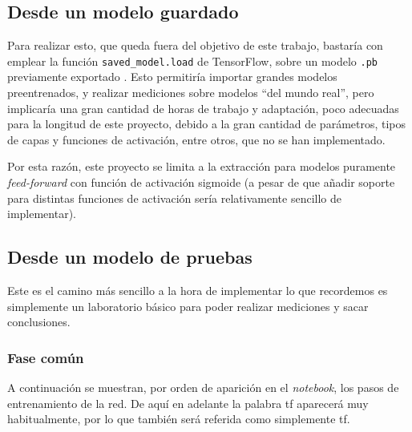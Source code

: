 \subsection{Desde un modelo guardado}
\label{ssec:desde_modelo_guardado}
Para realizar esto, que queda fuera del objetivo de este trabajo, bastaría con emplear la función \texttt{saved\_model.load} de TensorFlow, sobre un modelo \texttt{.pb} previamente exportado \cite{tensorflow_saved_model}. Esto permitiría importar grandes modelos preentrenados, y realizar mediciones sobre modelos ``del mundo real'', pero implicaría una gran cantidad de horas de trabajo y adaptación, poco adecuadas para la longitud de este proyecto, debido a la gran cantidad de parámetros, tipos de capas y funciones de activación, entre otros, que no se han implementado.

Por esta razón, este proyecto se limita a la extracción para modelos puramente \textit{feed-forward} con función de activación sigmoide (a pesar de que añadir soporte para distintas funciones de activación sería relativamente sencillo de implementar).

\subsection{Desde un modelo de pruebas}
\label{ssec:desde_modelo_de_pruebas}
Este es el camino más sencillo a la hora de implementar lo que recordemos es simplemente un laboratorio básico para poder realizar mediciones y sacar conclusiones.

\subsubsection{Fase común}
\label{sssec:modelo_pruebas_fase_comun}
A continuación se muestran, por orden de aparición en el \textit{notebook}, los pasos de entrenamiento de la red. De aquí en adelante la palabra \acrlong{tf} aparecerá muy habitualmente, por lo que también será referida como simplemente \acrshort{tf}.

